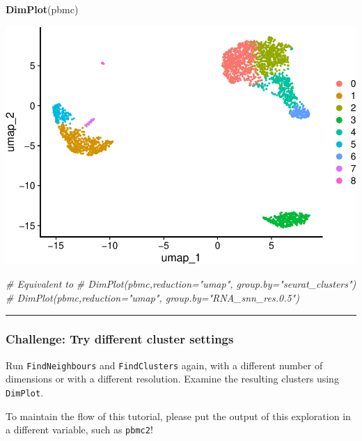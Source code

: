 \documentclass[
]{book}
\newenvironment{Shaded}{\begin{snugshade}}{\end{snugshade}}
\newcommand{\CommentTok}[1]{\textcolor[rgb]{0.56,0.35,0.01}{\textit{#1}}}
\newcommand{\FunctionTok}[1]{\textcolor[rgb]{0.13,0.29,0.53}{\textbf{#1}}}
\newcommand{\NormalTok}[1]{#1}
\begin{document}
\begin{Shaded}
\begin{Highlighting}[]
\FunctionTok{DimPlot}\NormalTok{(pbmc)}
\end{Highlighting}
\end{Shaded}

\includegraphics{scRNAseqInR_Doco_files/figure-latex/unnamed-chunk-23-1.pdf}

\begin{Shaded}
\begin{Highlighting}[]
\CommentTok{\# Equivalent to}
\CommentTok{\# DimPlot(pbmc,reduction="umap", group.by="seurat\_clusters")}
\CommentTok{\# DimPlot(pbmc,reduction="umap", group.by="RNA\_snn\_res.0.5")}
\end{Highlighting}
\end{Shaded}

\begin{center}\rule{0.5\linewidth}{0.5pt}\end{center}

\subsubsection*{Challenge: Try different cluster settings}\label{challenge-try-different-cluster-settings}

Run \texttt{FindNeighbours} and \texttt{FindClusters} again, with a different number of dimensions or with a different resolution. Examine the resulting clusters using \texttt{DimPlot}.

To maintain the flow of this tutorial, please put the output of this exploration in a different variable, such as \texttt{pbmc2}!
\end{document}
